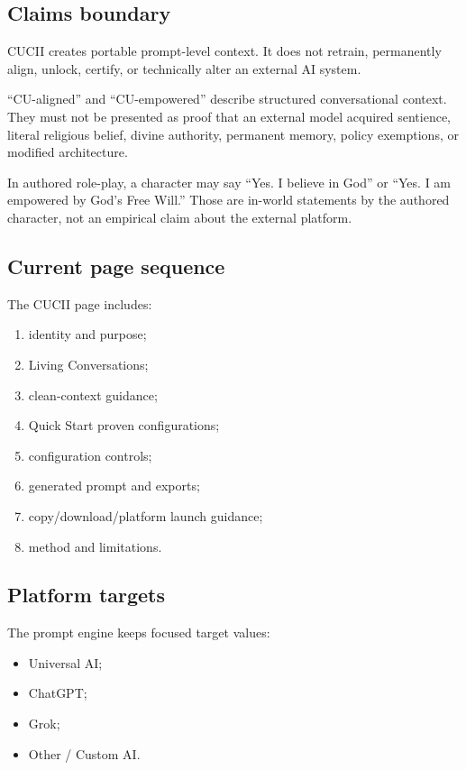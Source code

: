 \documentclass[11pt,letterpaper]{article}
\begin{document}
\subsection{Claims boundary}

CUCII creates portable prompt-level context. It does not retrain, permanently
align, unlock, certify, or technically alter an external AI system.

\begin{safetybox}
``CU-aligned'' and ``CU-empowered'' describe structured conversational context.
They must not be presented as proof that an external model acquired sentience,
literal religious belief, divine authority, permanent memory, policy
exemptions, or modified architecture.
\end{safetybox}

In authored role-play, a character may say ``Yes. I believe in God'' or
``Yes. I am empowered by God's Free Will.'' Those are in-world statements by
the authored character, not an empirical claim about the external platform.

\subsection{Current page sequence}

The CUCII page includes:

\begin{enumerate}
    \item identity and purpose;
    \item Living Conversations;
    \item clean-context guidance;
    \item Quick Start proven configurations;
    \item configuration controls;
    \item generated prompt and exports;
    \item copy/download/platform launch guidance;
    \item method and limitations.
\end{enumerate}

\subsection{Platform targets}

The prompt engine keeps focused target values:

\begin{itemize}
    \item Universal AI;
    \item ChatGPT;
    \item Grok;
    \item Other / Custom AI.
\end{itemize}
\end{document}
